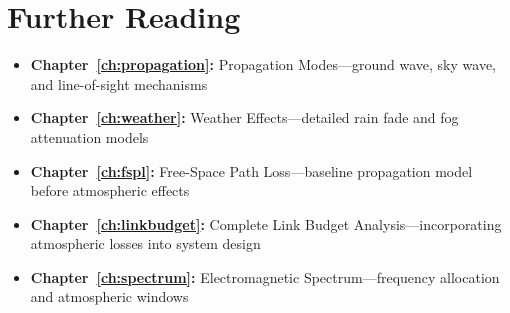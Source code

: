 \section{Further Reading}

\begin{itemize}
\item \textbf{Chapter~\ref{ch:propagation}:} Propagation Modes---ground wave, sky wave, and line-of-sight mechanisms
\item \textbf{Chapter~\ref{ch:weather}:} Weather Effects---detailed rain fade and fog attenuation models
\item \textbf{Chapter~\ref{ch:fspl}:} Free-Space Path Loss---baseline propagation model before atmospheric effects
\item \textbf{Chapter~\ref{ch:linkbudget}:} Complete Link Budget Analysis---incorporating atmospheric losses into system design
\item \textbf{Chapter~\ref{ch:spectrum}:} Electromagnetic Spectrum---frequency allocation and atmospheric windows
\end{itemize}
